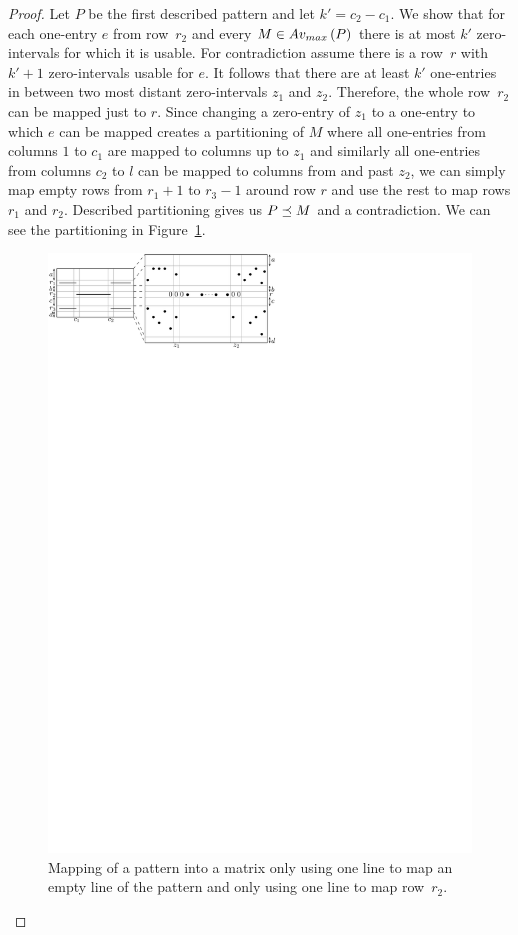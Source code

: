 \begin{proof}
Let $P$ be the first described pattern and let $k'=c_2-c_1$. We show that for each one-entry $e$ from row~$r_2$ and every $M\in Av_{max}\left(P\right)$ there is at most $k'$ zero-intervals for which it is usable. For contradiction assume there is a row~$r$ with $k'+1$ zero-intervals usable for $e$. It follows that there are at least $k'$ one-entries in between two most distant zero-intervals $z_1$ and $z_2$. Therefore, the whole row~$r_2$ can be mapped just to $r$. Since changing a zero-entry of $z_1$ to a one-entry to which $e$ can be mapped creates a partitioning of $M$ where all one-entries from columns $1$ to $c_1$ are mapped to columns up to $z_1$ and similarly all one-entries from columns $c_2$ to $l$ can be mapped to columns from and past $z_2$, we can simply map empty rows from $r_1+1$ to $r_3-1$ around row $r$ and use the rest to map rows $r_1$ and $r_2$. Described partitioning gives us $P\preceq M$ and a contradiction. We can see the partitioning in Figure~\ref{fig:lemmaH1}.
\begin{figure}[!ht]
\centering
\includegraphics[width=\textwidth]{img/lemmaH1.pdf}
\caption{Mapping of a pattern into a matrix only using one line to map an empty line of the pattern and only using one line to map row~$r_2$.}
\label{fig:lemmaH1}
\end{figure}


\end{proof}
